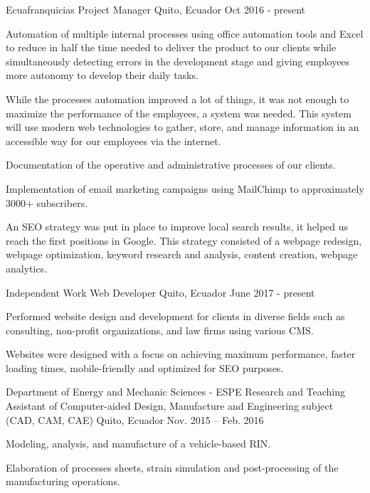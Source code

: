 
\begin{cventries}

  \cventry
    {Ecuafranquicias}
    {Project Manager}
    {Quito, Ecuador}
    {Oct 2016 - present}
    {
      \begin{cvitems}
        \item {Automation of multiple internal processes using oﬀice automation tools and Excel to reduce in half the time needed to deliver the product to our clients while simultaneously detecting errors in the development stage and giving employees more autonomy to develop their daily tasks.}
        \item {While the processes automation improved a lot of things, it was not enough to maximize the performance of the employees, a system was needed. This system will use modern web technologies to gather, store, and manage information in an accessible way for our employees via the internet.}
        \item {Documentation of the operative and administrative processes of our clients.}
        \item {Implementation of email marketing campaigns using MailChimp to approximately 3000+ subscribers.}
        \item {An SEO strategy was put in place to improve local search results, it helped us reach the first positions in Google. This strategy consisted of a webpage redesign, webpage optimization, keyword research and analysis, content creation, webpage analytics.}
      \end{cvitems}
    }

    \cventry
      {Independent Work}
      {Web Developer}
      {Quito, Ecuador}
      {June 2017 - present}
      {
        \begin{cvitems}
          \item {Performed website design and development for clients in diverse fields such as consulting, non-profit organizations, and law firms using various CMS.}
          \item {Websites were designed with a focus on achieving maximum performance, faster loading times, mobile-friendly and optimized for SEO purposes.}                       
        \end{cvitems} 
      }

  \cventry
    {Department of Energy and Mechanic Sciences - ESPE}
    {Research and Teaching Assistant of Computer-aided Design, Manufacture and Engineering subject (CAD, CAM, CAE)	}
    {Quito, Ecuador}
    {Nov. 2015 – Feb. 2016}
    {
      \begin{cvitems}
        \item {Modeling, analysis, and manufacture of a vehicle-based RIN.}
        \item {Elaboration of processes sheets, strain simulation and post-processing of the manufacturing operations.}
      \end{cvitems}
    }
  

\end{cventries}
